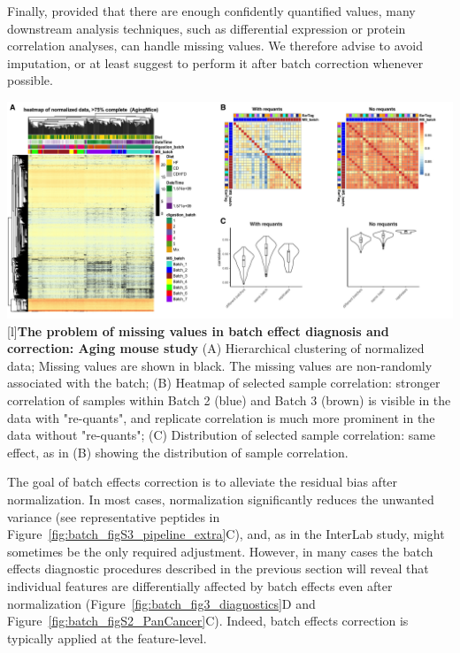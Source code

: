 \documentclass[num-refs]{wiley-article}
\begin{document}
{\begin{tcolorbox}
		Finally, provided that there are enough confidently quantified values, many downstream analysis techniques, such as differential expression or protein correlation analyses, can handle missing values. We therefore advise to avoid imputation, or at least suggest to perform it after batch correction whenever possible. 

		
		\begin{minipage}[h]{\linewidth}
			\includegraphics[width=.9\textwidth]{figures/Fig4_missing_values.pdf}
			[l]{\textbf{The problem of missing values in batch effect diagnosis and correction: Aging mouse study} }
			\label{fig:batch_fig4_missing_values}
			{\footnotesize  (A) Hierarchical clustering of normalized data; Missing values are shown in black. The missing values are non-randomly associated with the batch; (B) Heatmap of selected sample correlation: stronger correlation of samples within Batch 2 (blue) and Batch 3 (brown) is visible in the data with "re-quants", and replicate correlation is much more prominent in the data without "re-quants";	(C) Distribution of selected sample correlation: same effect, as in (B) showing the distribution of sample correlation.}
		\end{minipage}
	\end{tcolorbox}
	\clearpage
}

The goal of batch effects correction is to alleviate the residual bias after normalization. In most cases, normalization significantly reduces the unwanted variance (see representative peptides in Figure~\ref{fig:batch_figS3_pipeline_extra}C), and, as in the InterLab study, might sometimes be the only required adjustment. However, in many cases the batch effects diagnostic procedures described in the previous section will reveal that individual features are differentially affected by batch effects even after normalization (Figure~\ref{fig:batch_fig3_diagnostics}D and Figure~\ref{fig:batch_figS2_PanCancer}C). Indeed, batch effects correction is typically applied at the feature-level.
\end{document}
